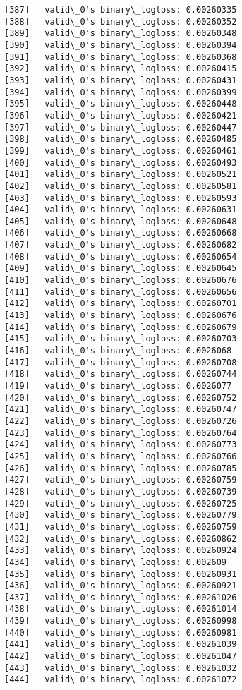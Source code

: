 \documentclass[11pt]{article}
\begin{document}
\begin{Verbatim}[commandchars=\\\{\}]
[387]	valid\_0's binary\_logloss: 0.00260335
[388]	valid\_0's binary\_logloss: 0.00260352
[389]	valid\_0's binary\_logloss: 0.00260348
[390]	valid\_0's binary\_logloss: 0.00260394
[391]	valid\_0's binary\_logloss: 0.00260368
[392]	valid\_0's binary\_logloss: 0.00260415
[393]	valid\_0's binary\_logloss: 0.00260431
[394]	valid\_0's binary\_logloss: 0.00260399
[395]	valid\_0's binary\_logloss: 0.00260448
[396]	valid\_0's binary\_logloss: 0.00260421
[397]	valid\_0's binary\_logloss: 0.00260447
[398]	valid\_0's binary\_logloss: 0.00260485
[399]	valid\_0's binary\_logloss: 0.00260461
[400]	valid\_0's binary\_logloss: 0.00260493
[401]	valid\_0's binary\_logloss: 0.00260521
[402]	valid\_0's binary\_logloss: 0.00260581
[403]	valid\_0's binary\_logloss: 0.00260593
[404]	valid\_0's binary\_logloss: 0.00260631
[405]	valid\_0's binary\_logloss: 0.00260648
[406]	valid\_0's binary\_logloss: 0.00260668
[407]	valid\_0's binary\_logloss: 0.00260682
[408]	valid\_0's binary\_logloss: 0.00260654
[409]	valid\_0's binary\_logloss: 0.00260645
[410]	valid\_0's binary\_logloss: 0.00260676
[411]	valid\_0's binary\_logloss: 0.00260656
[412]	valid\_0's binary\_logloss: 0.00260701
[413]	valid\_0's binary\_logloss: 0.00260676
[414]	valid\_0's binary\_logloss: 0.00260679
[415]	valid\_0's binary\_logloss: 0.00260703
[416]	valid\_0's binary\_logloss: 0.0026068
[417]	valid\_0's binary\_logloss: 0.00260708
[418]	valid\_0's binary\_logloss: 0.00260744
[419]	valid\_0's binary\_logloss: 0.0026077
[420]	valid\_0's binary\_logloss: 0.00260752
[421]	valid\_0's binary\_logloss: 0.00260747
[422]	valid\_0's binary\_logloss: 0.00260726
[423]	valid\_0's binary\_logloss: 0.00260764
[424]	valid\_0's binary\_logloss: 0.00260773
[425]	valid\_0's binary\_logloss: 0.00260766
[426]	valid\_0's binary\_logloss: 0.00260785
[427]	valid\_0's binary\_logloss: 0.00260759
[428]	valid\_0's binary\_logloss: 0.00260739
[429]	valid\_0's binary\_logloss: 0.00260725
[430]	valid\_0's binary\_logloss: 0.00260779
[431]	valid\_0's binary\_logloss: 0.00260759
[432]	valid\_0's binary\_logloss: 0.00260862
[433]	valid\_0's binary\_logloss: 0.00260924
[434]	valid\_0's binary\_logloss: 0.002609
[435]	valid\_0's binary\_logloss: 0.00260931
[436]	valid\_0's binary\_logloss: 0.00260921
[437]	valid\_0's binary\_logloss: 0.00261026
[438]	valid\_0's binary\_logloss: 0.00261014
[439]	valid\_0's binary\_logloss: 0.00260998
[440]	valid\_0's binary\_logloss: 0.00260981
[441]	valid\_0's binary\_logloss: 0.00261039
[442]	valid\_0's binary\_logloss: 0.00261047
[443]	valid\_0's binary\_logloss: 0.00261032
[444]	valid\_0's binary\_logloss: 0.00261072

\end{Verbatim}
\end{document}
